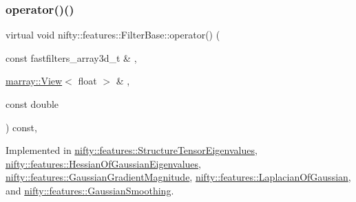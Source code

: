 \mbox{\label{structnifty_1_1features_1_1FilterBase_abbef4e9c260026926e0021aa0cc11c81}} 
\subsubsection{\texorpdfstring{operator()()}{operator()()}\hspace{0.1cm}{\footnotesize\ttfamily [2/2]}}
{\footnotesize\ttfamily virtual void nifty\+::features\+::\+Filter\+Base\+::operator() (\begin{DoxyParamCaption}\item[{const fastfilters\+\_\+array3d\+\_\+t \&}]{,  }\item[{\hyperlink{classandres_1_1View}{marray\+::\+View}$<$ float $>$ \&}]{,  }\item[{const double}]{ }\end{DoxyParamCaption}) const\hspace{0.3cm}{\ttfamily [inline]}, {}}



Implemented in \hyperlink{structnifty_1_1features_1_1StructureTensorEigenvalues_a18437b6743a641b081b6053115305bad}{nifty\+::features\+::\+Structure\+Tensor\+Eigenvalues}, \hyperlink{structnifty_1_1features_1_1HessianOfGaussianEigenvalues_a7c21f5d043af68d6f330c5b9bdf95310}{nifty\+::features\+::\+Hessian\+Of\+Gaussian\+Eigenvalues}, \hyperlink{structnifty_1_1features_1_1GaussianGradientMagnitude_a0c442cf0666188ae0dcea15adfa725b8}{nifty\+::features\+::\+Gaussian\+Gradient\+Magnitude}, \hyperlink{structnifty_1_1features_1_1LaplacianOfGaussian_a1b7536cdff2a3f16035d55c58e3922ce}{nifty\+::features\+::\+Laplacian\+Of\+Gaussian}, and \hyperlink{structnifty_1_1features_1_1GaussianSmoothing_a8daf036e19adc709e3790566861efb86}{nifty\+::features\+::\+Gaussian\+Smoothing}.

\mbox{\label{structnifty_1_1features_1_1FilterBase_ab59d743ba07608b8aaa37e59f049431e}} 

